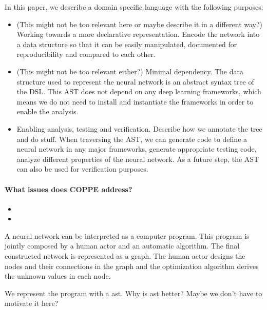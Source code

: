 In this paper, we describe a domain specific language with the following purposes:
\begin{itemize}
\item (This might not be too relevant here or maybe describe it in a different way?) Working towards a more declarative representation. Encode the network into a data structure so that it can be easily manipulated, documented for reproducibility and compared to each other.
\item (This might not be too relevant either?) Minimal dependency. The data structure used to represent the neural network is an abstract syntax tree of the DSL. This AST does not depend on any deep learning frameworks, which means we do not need to install and instantiate the frameworks in order to enable the analysis.
\item Enabling analysis, testing and verification. Describe how we annotate the tree and do stuff. When traversing the AST, we can generate code to define a neural network in any major frameworks, generate appropriate testing code, analyze different properties of the neural network. As a future step, the AST can also be used for verification purposes.
\end{itemize}


\paragraph{What issues does COPPE address?}
\begin{itemize}
\item
\item
\end{itemize}



A neural network can be interpreted as a computer program. This program is jointly composed by a human actor and an automatic algorithm. The final constructed network is represented as a graph.
The human actor designs the nodes and their connections in the graph and the optimization algorithm derives the unknown values in each node.

We represent the program with a ast. Why is ast better? Maybe we don't have to motivate it here?




